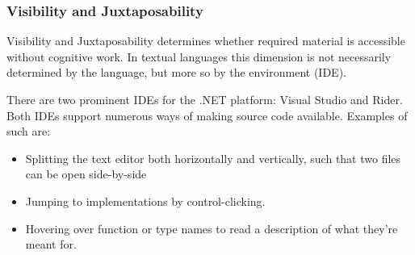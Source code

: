 \subsubsection{Visibility and Juxtaposability}
Visibility and Juxtaposability determines whether required material is accessible without cognitive work\cite{green1996usability}. In textual languages this dimension is not necessarily determined by the language, but more so by the environment (\gls{IDE}).

There are two prominent \glspl{IDE} for the .NET platform: Visual Studio and Rider. Both \glspl{IDE} support numerous ways of making source code available. Examples of such are:
\begin{itemize}
    \item Splitting the text editor both horizontally and vertically, such that two files can be open side-by-side
    \item Jumping to implementations by control-clicking.
    \item Hovering over function or type names to read a description of what they're meant for. 
\end{itemize}
